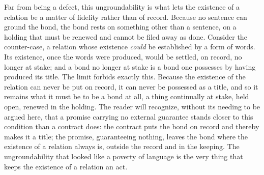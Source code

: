 Far from being a defect, this ungroundability is what lets the existence of a relation be a matter of fidelity rather than of record. Because no sentence can ground the bond, the bond rests on something other than a sentence, on a holding that must be renewed and cannot be filed away as done. Consider the counter-case, a relation whose existence \emph{could} be established by a form of words. Its existence, once the words were produced, would be settled, on record, no longer at stake; and a bond no longer at stake is a bond one possesses by having produced its title. The limit forbids exactly this. Because the existence of the relation can never be put on record, it can never be possessed as a title, and so it remains what it must be to be a bond at all, a thing continually at stake, held open, renewed in the holding. The reader will recognize, without its needing to be argued here, that a promise carrying no external guarantee stands closer to this condition than a contract does: the contract puts the bond on record and thereby makes it a title; the promise, guaranteeing nothing, leaves the bond where the existence of a relation always is, outside the record and in the keeping. The ungroundability that looked like a poverty of language is the very thing that keeps the existence of a relation an act.
